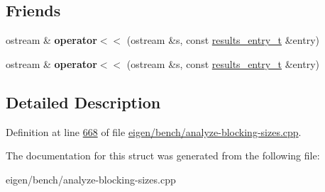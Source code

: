 \subsection*{Friends}
\begin{DoxyCompactItemize}
\item 
\mbox{\label{structevaluate__defaults__action__t_aab3febfa4c8b75921d2427f7b40d09ae}} 
ostream \& {\bfseries operator$<$$<$} (ostream \&s, const \hyperlink{structevaluate__defaults__action__t_1_1results__entry__t}{results\+\_\+entry\+\_\+t} \&entry)
\item 
\mbox{\label{structevaluate__defaults__action__t_aab3febfa4c8b75921d2427f7b40d09ae}} 
ostream \& {\bfseries operator$<$$<$} (ostream \&s, const \hyperlink{structevaluate__defaults__action__t_1_1results__entry__t}{results\+\_\+entry\+\_\+t} \&entry)
\end{DoxyCompactItemize}


\subsection{Detailed Description}


Definition at line \hyperlink{eigen_2bench_2analyze-blocking-sizes_8cpp_source_l00668}{668} of file \hyperlink{eigen_2bench_2analyze-blocking-sizes_8cpp_source}{eigen/bench/analyze-\/blocking-\/sizes.\+cpp}.



The documentation for this struct was generated from the following file\+:\begin{DoxyCompactItemize}
\item 
eigen/bench/analyze-\/blocking-\/sizes.\+cpp\end{DoxyCompactItemize}
